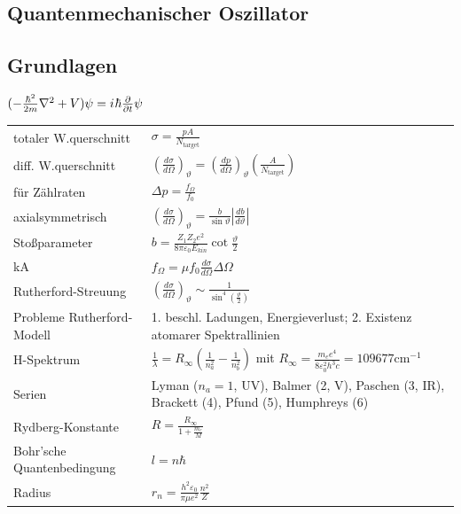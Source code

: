 \documentclass[12pt,a4paper]{article}
\newcommand{\iu}{{i\mkern1mu}}
\newcommand{\abs}[1]{\left| #1 \right|}
\renewcommand{\d}[2]{\frac{d #1}{d #2}}
\newcommand{\pd}[2]{\frac{\partial #1}{\partial #2}}
\renewcommand{\=}[1]{\stackrel{#1}{=}}
\theoremstyle{definition}
\theoremstyle{remark}
\begin{document}
\subsection{Quantenmechanischer Oszillator}


\subsection{Grundlagen}
\begin{framed}
$(-\frac{\hbar^2}{2m} \nabla^2 + V)\psi = \iu \hbar \pd{}{t} \psi$
\end{framed}
\begin{center}
\begin{minipage}[t]{.35\linewidth}
\vspace{0pt}
\noindent\begin{tabular}{ll}
\toprule
totaler W.querschnitt &  $\sigma = \frac{pA}{N_{\text{target}}}$\\
diff. W.querschnitt &  $(\d{\sigma}{\Omega})_{\vartheta} = (\d{p}{\Omega})_{\vartheta} (\frac{A}{N_{\text{target}}})$\\
für Zählraten &  $\Delta p = \frac{f_{\Omega}}{f_0}$\\
axialsymmetrisch &  $(\d{\sigma}{\Omega})_{\vartheta} = \frac{b}{\sin\vartheta} \abs{\d{b}{\vartheta}}$\\
Stoßparameter & $b = \frac{Z_1 Z_2 e^2}{8\pi \varepsilon_0 E_{kin}} \cot \frac{\vartheta}{2}$\\
kA & $f_{\Omega} = \mu f_0 \d{\sigma}{\Omega} \Delta \Omega$\\
Rutherford-Streuung &  $(\d{\sigma}{\Omega})_{\vartheta} \sim \frac{1}{\sin^4 (\frac{\vartheta}{2})}$\\
Probleme Rutherford-Modell & 1. beschl. Ladungen, Energieverlust; 2. Existenz atomarer Spektrallinien\\
H-Spektrum &  $\frac{1}{\lambda} = R_{\infty} (\frac{1}{n_a^2} - \frac{1}{n_b^2})$ mit $R_{\infty} = \frac{m_e e^4}{8 \varepsilon_0^2 h^3 c} = 109677 \text{cm}^{-1}$\\
Serien & Lyman ($n_a = 1$, UV), Balmer (2, V), Paschen (3, IR), Brackett (4), Pfund (5), Humphreys (6)\\
Rydberg-Konstante & $R = \frac{R_{\infty}}{1+\frac{m_e}{M}}$\\
Bohr'sche Quantenbedingung & $l = n \hbar$\\
Radius &  $r_n = \frac{h^2 \varepsilon_0}{\pi \mu e^2} \frac{n^2}{Z}$


\end{tabular}
\end{minipage}
\end{center}
\end{document}
